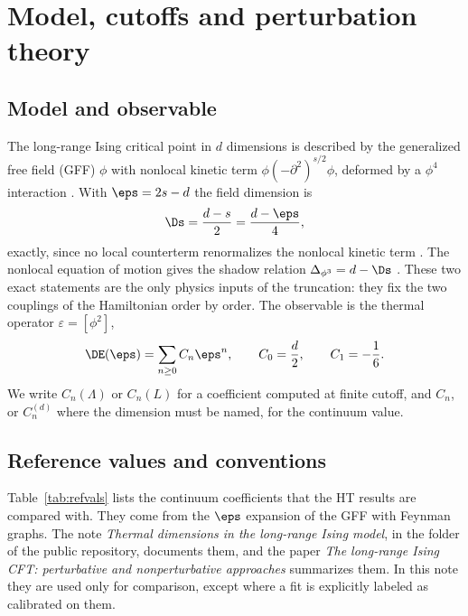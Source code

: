 \section{Model, cutoffs and perturbation theory}\label{sec:method}

\subsection{Model and observable}
The long-range Ising critical point in $d$ dimensions is described by the generalized free field (GFF) $\phi$ with
nonlocal kinetic term $\phi(-\partial^2)^{s/2}\phi$, deformed by a $\phi^4$ interaction
\cite{Fisher:1972zz,Sak:1973oqx,Paulos:2015jfa}. With $\eps=2s-d$ the field dimension is
\begin{equation}
 \Ds=\frac{d-s}{2}=\frac{d-\eps}{4},
\end{equation}
exactly, since no local counterterm renormalizes the nonlocal kinetic term \cite{Paulos:2015jfa}. The nonlocal
equation of motion gives the shadow relation $\Delta_{\phi^3}=d-\Ds$ \cite{Paulos:2015jfa}. These two exact statements
are the only physics inputs of the truncation: they fix the two couplings of the Hamiltonian order by order. The
observable is the thermal operator $\varepsilon=[\phi^2]$,
\begin{equation}
 \DE(\eps)=\sum_{n\ge0}C_n\eps^n,\qquad C_0=\frac d2,\qquad C_1=-\frac16 .
 \label{eq:Cn}
\end{equation}
We write $C_n(\Lambda)$ or $C_n(L)$ for a coefficient computed at finite cutoff, and $C_n$, or $C_n^{(d)}$ where the
dimension must be named, for the continuum value.

\subsection{Reference values and conventions}\label{sec:refvals}
Table~\ref{tab:refvals} lists the continuum coefficients that the HT results are compared with. They come from the
$\eps$ expansion of the GFF with Feynman graphs. The note \emph{Thermal dimensions in the long-range Ising model}, in
the folder  of the public repository, documents them, and the paper \emph{The long-range Ising
CFT: perturbative and nonperturbative approaches} summarizes them. In this note they are used only for
comparison, except where a fit is explicitly labeled as calibrated on them.

